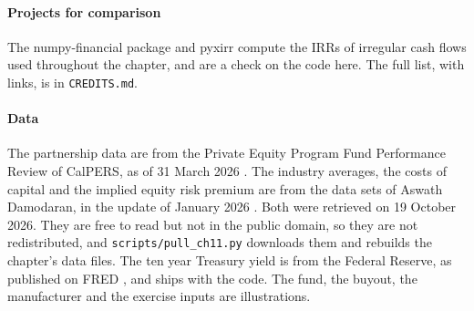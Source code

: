 \begin{chapterrefs}
\paragraph{Projects for comparison}
The numpy-financial package \parencite{numpyfinancial} and pyxirr \parencite{pyxirr} compute the IRRs of
irregular cash flows used throughout the chapter, and are a check on the code here. The full list, with
links, is in \texttt{CREDITS.md}.

\paragraph{Data}
The partnership data are from the Private Equity Program Fund Performance Review of CalPERS, as of 31
March 2026 \parencite{calpers2026}. The industry averages, the costs of capital and the implied equity
risk premium are from the data sets of Aswath Damodaran, in the update of January 2026
\parencite{damodaran2026}. Both were retrieved on 19 October 2026. They are free to read but not in the
public domain, so they are not redistributed, and \texttt{scripts/pull\_ch11.py} downloads them and
rebuilds the chapter's data files. The ten year Treasury yield is from the Federal Reserve, as published
on FRED \parencite{fredch11}, and ships with the code. The fund, the buyout, the manufacturer and the
exercise inputs are illustrations.

\end{chapterrefs}
\flushbottom
